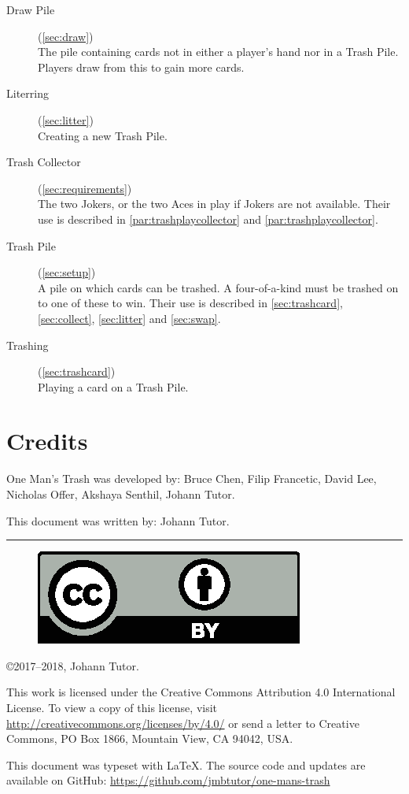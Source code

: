 \documentclass{article}
\newcommand\thegame{One Man's Trash}
\begin{document}
\begin{description}
  \item[Draw Pile] (\autoref{sec:draw})\\
    The pile containing cards not in either a player's hand nor in a Trash Pile. Players draw from this to gain more cards.
  \item[Literring] (\autoref{sec:litter})\\
    Creating a new Trash Pile.
  \item[Trash Collector] (\autoref{sec:requirements})\\
    The two Jokers, or the two Aces in play if Jokers are not available. Their use is described in \autoref{par:trashplaycollector} and \autoref{par:trashplaycollector}.
  \item[Trash Pile] (\autoref{sec:setup})\\
    A pile on which cards can be trashed. A four-of-a-kind must be trashed on to one of these to win. Their use is described in \autoref{sec:trashcard}, \autoref{sec:collect}, \autoref{sec:litter} and \autoref{sec:swap}.
  \item[Trashing] (\autoref{sec:trashcard})\\
    Playing a card on a Trash Pile.
\end{description}

\newpage
\section{Credits \label{sec:credits}}

\thegame{} was developed by:
Bruce Chen,
Filip Francetic,
David Lee,
Nicholas Offer,
Akshaya Senthil,
Johann Tutor.

This document was written by:
Johann Tutor.

\medskip
\hrule

{
  \small
  \begin{figure}
    \includegraphics[scale=0.5]{cc-by.eps}
  \end{figure}

  \copyright 2017--2018, Johann Tutor.

  This work is licensed under the Creative Commons Attribution 4.0
  International License. To view a copy of this license, visit
  \url{http://creativecommons.org/licenses/by/4.0/} or send a letter to Creative Commons, PO Box 1866, Mountain View, CA 94042, USA.

  This document was typeset with \LaTeX. The source code and updates are available on GitHub: \url{https://github.com/jmbtutor/one-mans-trash}
}
\end{document}

